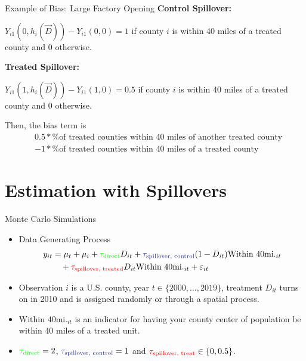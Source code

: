 \documentclass[aspectratio=169]{beamer}
\begin{document}
\begin{frame}{Example of Bias: Large Factory Opening}\label{slide:example_bias}
    \textbf{Control Spillover:}
    
    $Y_{i1}(0, h_i(\vec{D})) - Y_{i1}(0, 0) = 1$ if county $i$ is within 40 miles of a treated county and $0$ otherwise.

    \textbf{Treated Spillover:}
    
    $Y_{i1}(1, h_i(\vec{D})) - Y_{i1}(1, 0) = 0.5$ if county $i$ is within 40 miles of a treated county and $0$ otherwise.
        
    \pause
    Then, the bias term is 
    \begin{align*}
        &0.5 * \text{\% of treated counties within 40 miles of another treated county} \\
        &-1 * \text{\% of treated counties within 40 miles of a treated county}
    \end{align*}

    \hyperlink{slide:partial_identification}{}
\end{frame}





\section{Estimation with Spillovers}


\begin{frame}{Monte Carlo Simulations}
    \begin{itemize}
        \item Data Generating Process 
        \begin{align*}
            y_{it} &= \mu_t + \mu_i + \textcolor{green}{\tau_{\text{direct}}} D_{it} + \textcolor{purple}{\tau_{\text{spillover, control}}} (1-D_{it}) \text{Within 40mi.}_{it} \\ 
            &\quad + \textcolor{red}{\tau_{\text{spillover, treated}}} D_{it} \text{Within 40mi.}_{it} + \varepsilon_{it}
        \end{align*}

        \item Observation $i$ is a U.S. county, year $t \in \{2000, \dots, 2019\}$, treatment $D_{it}$ turns on in 2010 and is assigned randomly or through a spatial process.
        
        \item $\text{Within 40mi.}_{it}$ is an indicator for having your county center of population be within 40 miles of a treated unit. 
        
        \item $\textcolor{green}{\tau_{\text{direct}}} = 2$, $\textcolor{purple}{\tau_{\text{spillover, control}}} = 1$ and $\textcolor{red}{\tau_{\text{spillover, treat}}} \in \{0, 0.5\}$.
    \end{itemize}
\end{frame}
\end{document}
